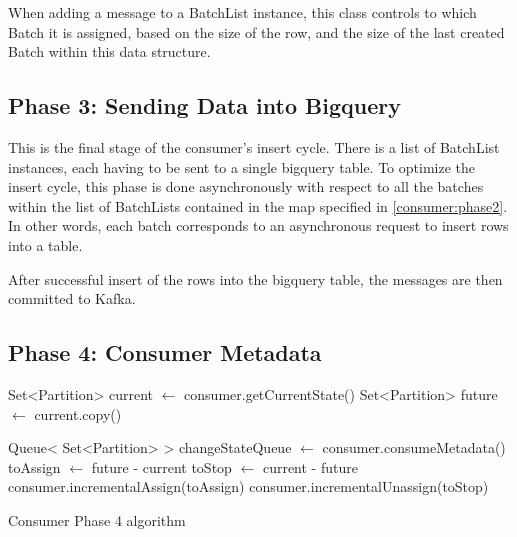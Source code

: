 When adding a message to a BatchList instance, this class controls to which
Batch it is assigned, based on the size of the row, and the size of the last
created Batch within this data structure.

\subsection{Phase 3: Sending Data into Bigquery}

This is the final stage of the consumer's insert cycle. There is a list of
BatchList instances, each having to be sent to a single bigquery table. To
optimize the insert cycle, this phase is done asynchronously with respect to all
the batches within the list of BatchLists contained in the map specified in
\ref{consumer:phase2}. In other words, each batch corresponds to an asynchronous
request to insert rows into a table.

After successful insert of the rows into the bigquery table, the messages are
then committed to Kafka. 

\subsection{Phase 4: Consumer Metadata}

\IncMargin{1em} \begin{algorithm}[h]
     
    \Output{} \BlankLine

Set<Partition> current $\gets$ consumer.getCurrentState()\; Set<Partition>
    future $\gets$ current.copy()\;

Queue< Set<Partition> > changeStateQueue $\gets$ consumer.consumeMetadata()\;
     toAssign
    $\gets$ future - current\; \label{algo:phase_4_toAssign} toStop $\gets$
    current - future\; consumer.incrementalAssign(toAssign)\;
    consumer.incrementalUnassign(toStop)\;
    \label{algo:phase_4_incremental_assign}

\caption{Consumer Phase 4 algorithm} \label{algo:phase_4}
\end{algorithm}\DecMargin{1em}

